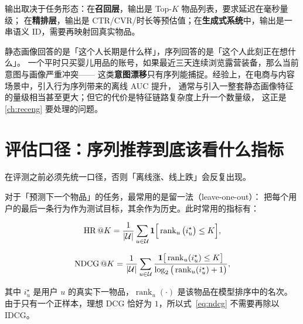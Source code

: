 输出取决于任务形态：在\textbf{召回层}，输出是 Top-$K$ 物品列表，要求延迟在毫秒量级；
在\textbf{精排层}，输出是 CTR/CVR/时长等预估值；在\textbf{生成式系统}中，输出是一串语义 ID，需要再映射回真实物品。

\begin{insight}[序列信号为什么不可替代]
静态画像回答的是「这个人长期是什么样」，序列回答的是「这个人此刻正在想什么」。
一个平时只买婴儿用品的账号，如果最近三天连续浏览露营装备，那么当前意图与画像严重冲突——
这类\textbf{意图漂移}只有序列能捕捉。经验上，在电商与内容场景中，引入行为序列带来的离线 AUC 提升，
通常与引入一整套静态画像特征的量级相当甚至更大；但它的代价是特征链路复杂度上升一个数量级，
这正是 \cref{ch:receng} 要处理的问题。
\end{insight}

\section{评估口径：序列推荐到底该看什么指标}

在评测之前必须先统一口径，否则「离线涨、线上跌」会反复出现。

对于「预测下一个物品」的任务，最常用的是留一法（leave-one-out）：
把每个用户的最后一条行为作为测试目标，其余作为历史。此时常用的指标有：

\begin{equation}
\operatorname{HR}\text{@}K = \frac{1}{\left\lvert \mathcal{U} \right\rvert} \sum_{u \in \mathcal{U}}
\mathbf{1}\Big[ \operatorname{rank}_u\big( i^{\star}_u \big) \le K \Big],
\label{eq:hr}
\end{equation}

\begin{equation}
\operatorname{NDCG}\text{@}K = \frac{1}{\left\lvert \mathcal{U} \right\rvert} \sum_{u \in \mathcal{U}}
\frac{ \mathbf{1}\big[ \operatorname{rank}_u(i^{\star}_u) \le K \big] }
     { \log_2 \big( \operatorname{rank}_u(i^{\star}_u) + 1 \big) },
\label{eq:ndcg}
\end{equation}

其中 $i^{\star}_u$ 是用户 $u$ 的真实下一物品，$\operatorname{rank}_u(\cdot)$ 是该物品在模型排序中的名次。
由于只有一个正样本，理想 DCG 恰好为 $1$，所以式~\eqref{eq:ndcg} 不需要再除以 IDCG。


